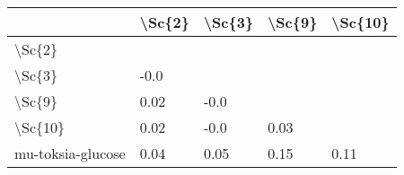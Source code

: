 \begin{tabular}{lllll}
\toprule
{} & \textbackslash Sc\{2\} & \textbackslash Sc\{3\} & \textbackslash Sc\{9\} & \textbackslash Sc\{10\} \\
\midrule
\textbackslash Sc\{2\}            &        &        &        &         \\
\textbackslash Sc\{3\}            &   -0.0 &        &        &         \\
\textbackslash Sc\{9\}            &   0.02 &   -0.0 &        &         \\
\textbackslash Sc\{10\}           &   0.02 &   -0.0 &   0.03 &         \\
mu-toksia-glucose &   0.04 &   0.05 &   0.15 &    0.11 \\
\bottomrule
\end{tabular}
